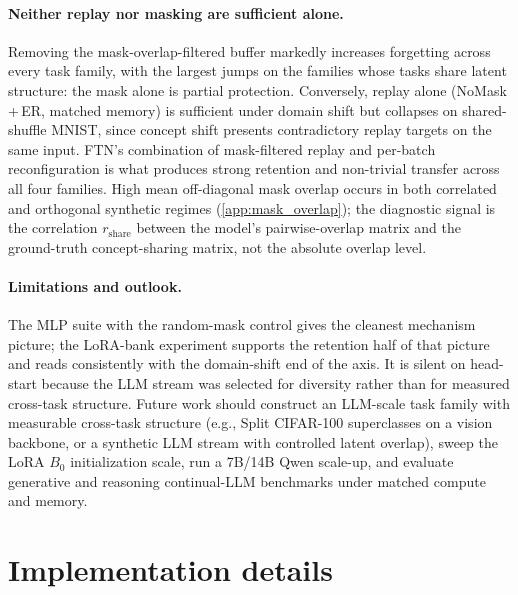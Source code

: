 \documentclass{article}
\begin{document}
\paragraph{Neither replay nor masking are sufficient alone.}
Removing the mask-overlap-filtered buffer markedly increases forgetting across every task family, with the largest jumps on the families whose tasks share latent structure: the mask alone is partial protection. Conversely, replay alone (NoMask\,+\,ER, matched memory) is sufficient under domain shift but collapses on shared-shuffle MNIST, since concept shift presents contradictory replay targets on the same input. FTN's combination of mask-filtered replay and per-batch reconfiguration is what produces strong retention and non-trivial transfer across all four families. High mean off-diagonal mask overlap occurs in both correlated and orthogonal synthetic regimes (\cref{app:mask_overlap}); the diagnostic signal is the correlation $r_{\mathrm{share}}$ between the model's pairwise-overlap matrix and the ground-truth concept-sharing matrix, not the absolute overlap level.

\paragraph{Limitations and outlook.}
The MLP suite with the random-mask control gives the cleanest mechanism picture; the LoRA-bank experiment supports the retention half of that picture and reads consistently with the domain-shift end of the axis. It is silent on head-start because the LLM stream was selected for diversity rather than for measured cross-task structure. Future work should construct an LLM-scale task family with measurable cross-task structure (e.g., Split CIFAR-100 superclasses on a vision backbone, or a synthetic LLM stream with controlled latent overlap), sweep the LoRA $B_0$ initialization scale, run a 7B/14B Qwen scale-up, and evaluate generative and reasoning continual-LLM benchmarks under matched compute and memory.





\newpage
\appendix

\section{Implementation details}\label{app:impl}
\end{document}
